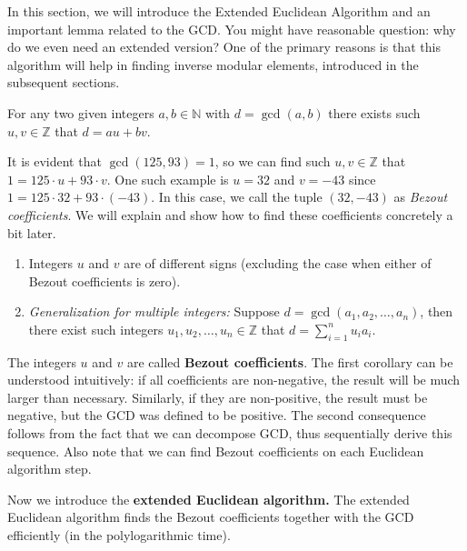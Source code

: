 \documentclass[../lecture-notes-148x210.tex]{subfiles}
\begin{document}
In this section, we will introduce the Extended Euclidean Algorithm and an
important lemma related to the GCD. You might have reasonable question: why do
we even need an extended version? One of the primary reasons is that this 
algorithm will help in finding inverse modular elements, introduced in the 
subsequent sections.

\begin{lemma}  \label{lemma:bezout_identity}
    For any two given integers $a, b \in \mathbb{N}$ with $d = \gcd(a, b)$ there exists such 
    $u, v \in \mathbb{Z}$ that $d = au + bv$.
\end{lemma}

\begin{example}
    It is evident that $\gcd(125, 93) = 1$, so we can find such $u, v \in
    \mathbb{Z}$ that $1 = 125 \cdot u + 93 \cdot v$. One such example is $u =
    32$ and $v = -43$ since $1 = 125 \cdot 32 + 93 \cdot (-43)$. In this case,
    we call the tuple $(32,-43)$ as \textit{Bezout coefficients}. We will explain and show
    how to find these coefficients concretely a bit later.
\end{example}

\begin{corollary} 
    \hfill
    \begin{enumerate}
        \item Integers $u$ and $v$ are of different signs (excluding the case when either of Bezout coefficients is zero).
        \item \textit{Generalization for multiple integers:} Suppose $d = \gcd(a_1, a_2, \dots, a_n)$, then there 
        exist such integers $u_1, u_2, \dots, u_n \in \mathbb{Z}$ that $d = \sum_{i=1}^nu_ia_i$.
    \end{enumerate}    
\end{corollary}

The integers $u$ and $v$ are called \textbf{Bezout coefficients}. The first
corollary can be understood intuitively: if all coefficients are non-negative,
the result will be much larger than necessary. Similarly, if they are
non-positive, the result must be negative, but the GCD was defined to be
positive. The second consequence follows from the fact that we can decompose
GCD, thus sequentially derive this sequence. Also note that we can find Bezout
coefficients on each Euclidean algorithm step.

Now we introduce the \textbf{extended Euclidean algorithm.} The extended
Euclidean algorithm finds the Bezout coefficients together with the GCD
efficiently (in the polylogarithmic time).
\end{document}
